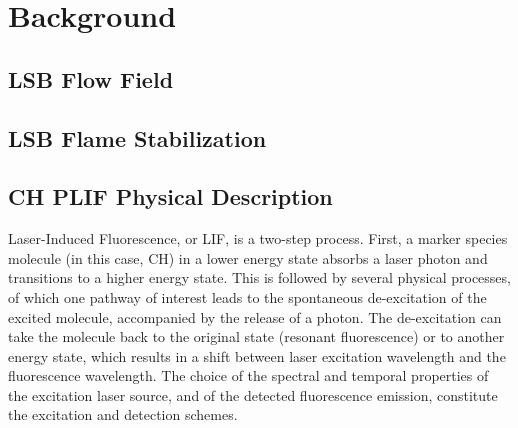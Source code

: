 \chapter{Background}
\label{ch:background}




\section{LSB Flow Field}

\section{LSB Flame Stabilization}

\section{CH PLIF Physical Description}
\label{sec:background-ch-plif-physical-description}

Laser-Induced Fluorescence, or LIF, is a two-step process.
First, a marker species molecule (in this case, CH) in a lower energy state absorbs a laser photon and transitions to a higher energy state.
This is followed by several physical processes, of which one pathway of interest leads to the spontaneous de-excitation of the excited molecule, accompanied by the release of a photon.
The de-excitation can take the molecule back to the original state (resonant fluorescence) or to another energy state, which results in a shift between laser excitation wavelength and the fluorescence wavelength. 
The choice of the spectral and temporal properties of the excitation laser source, and of the detected fluorescence emission, constitute the excitation and detection schemes.

